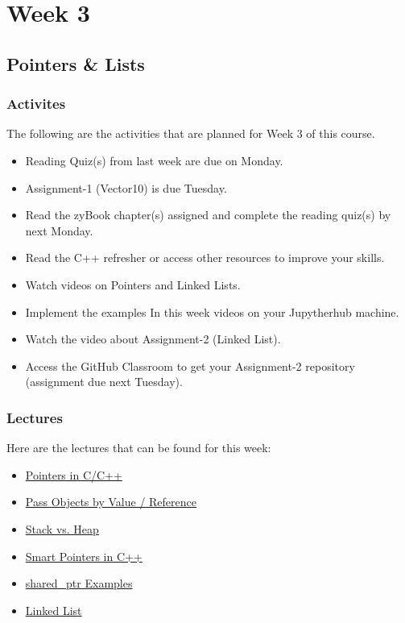 \clearpage

\renewcommand{\ChapTitle}{Week 3}
\renewcommand{\SectionTitle}{Pointers \& Lists}

\chapter{\ChapTitle}

\section{\SectionTitle}

\subsection{Activites}
The following are the activities that are planned for Week 3 of this course.
\begin{itemize}
    \item Reading Quiz(s) from last week are due on Monday.
    \item Assignment-1 (Vector10) is due Tuesday.
    \item Read the zyBook chapter(s) assigned and complete the reading quiz(s) by next Monday.
    \item Read the C++ refresher or access other resources to improve your skills.
    \item Watch videos on Pointers and Linked Lists.
    \item Implement the examples In this week videos on your Jupytherhub machine.
    \item Watch the video about Assignment-2 (Linked List).
    \item Access the GitHub Classroom to get your Assignment-2 repository  (assignment due next Tuesday).
\end{itemize}

\subsection{Lectures}
Here are the lectures that can be found for this week:
\begin{itemize}
    \item \href{https://www.youtube.com/watch?v=PLQK95HoMR8}{Pointers in C/C++}
    \item \href{https://www.youtube.com/watch?v=r1gCuzMQWP8}{Pass Objects by Value / Reference}
    \item \href{https://www.youtube.com/watch?v=HeJEOz7CFUU}{Stack vs. Heap}
    \item \href{https://www.youtube.com/watch?v=lnFReYlnNYw}{Smart Pointers in C++}
    \item \href{https://www.youtube.com/watch?v=4lyTPdZwp0w}{shared\_ptr Examples}
    \item \href{https://www.youtube.com/watch?v=8uPA8BpaRu4}{Linked List}
\end{itemize}


